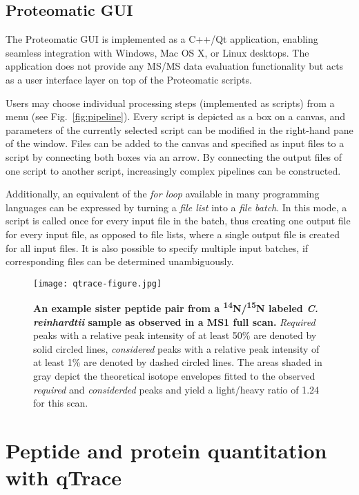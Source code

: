 \subsection{Proteomatic GUI}

The Proteomatic GUI is implemented as a C++/Qt application, enabling seamless 
integration with Windows, Mac OS X, or Linux desktops.
The application does not provide any MS/MS data evaluation functionality but
acts as a user interface layer on top of the Proteomatic scripts.

Users may choose individual processing steps (implemented as scripts) from a 
menu (see Fig.~\ref{fig:pipeline}). 
Every script is depicted as a box on a canvas, and parameters of
the currently selected script can be modified in the right-hand pane
of the window.
Files can be added to the canvas and specified as input files to a script by 
connecting both boxes via an arrow.
By connecting the output files of one script to another script, increasingly
complex pipelines can be constructed.

Additionally, an equivalent of the {\em for loop} available in many programming 
languages can be expressed by turning a {\em file list} into a {\em file batch}. 
In this mode, a script is called once for every input file in the batch, 
thus creating one output file for every input file, as opposed to file lists,
where a single output file is created for all input files.
It is also possible to specify multiple input batches, if corresponding files 
can be determined unambiguously.

\begin{figure*}
\texttt{[image: qtrace-figure.jpg]}
\caption{
    {\bf An example sister peptide pair from a 
    \textsuperscript{14}N/\textsuperscript{15}N labeled 
    {\em C. reinhardtii} sample as observed in a MS1 full scan. }
    {\em Required} peaks with a relative peak intensity of at least 50\% are 
    denoted by solid circled lines, {\em considered} peaks with a relative peak 
    intensity of at least 1\% are denoted by dashed circled lines. 
    The areas shaded in gray depict the theoretical isotope envelopes fitted to
    the observed {\em required} and {\em considerded} peaks and yield a light/heavy
    ratio of 1.24 for this scan.}
\label{fig:qtrace}
\end{figure*}

\section{Peptide and protein quantitation with qTrace}

